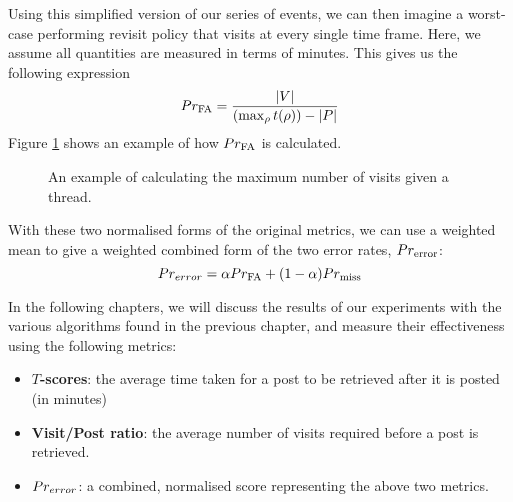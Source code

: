 \pagebreak
Using this simplified version of our series of events, we can then imagine a 
worst-case performing revisit policy that visits at every single time frame.  
Here, we assume all quantities are measured in terms of minutes. This gives us 
the following expression
\[
	\P_{\text{FA}} = \frac{|V|}{(\max_{\post}t(\post)) - |P|}
\]
Figure \ref{fig:norm_fa_score} shows an example of how $\P_{\text{FA}}$ is 
calculated.

\begin{figure}
\begin{center}
	
\end{center}
\caption{An example of calculating the maximum number of visits given a thread.  
}
\label{fig:norm_fa_score}
\end{figure}


With these two normalised forms of the original metrics, we can use a weighted 
mean to give a weighted combined form of the two error rates, 
$\P_{\text{error}}$:
\[
	\prerror = \alpha\P_{\text{FA}} + (1-\alpha)\P_{\text{miss}}
\]


In the following chapters, we will discuss the results of our experiments with 
the various algorithms found in the previous chapter, and measure their 
effectiveness using the following metrics:
\begin{itemize}
	\item \textbf{$T$-scores}: the average time taken for a post to be retrieved 
		after it is posted (in minutes)
	\item \textbf{Visit/Post ratio}: the average number of visits required 
		before a post is retrieved.
	\item $\prerror$: a combined, normalised score representing the above two 
		metrics.
\end{itemize}

